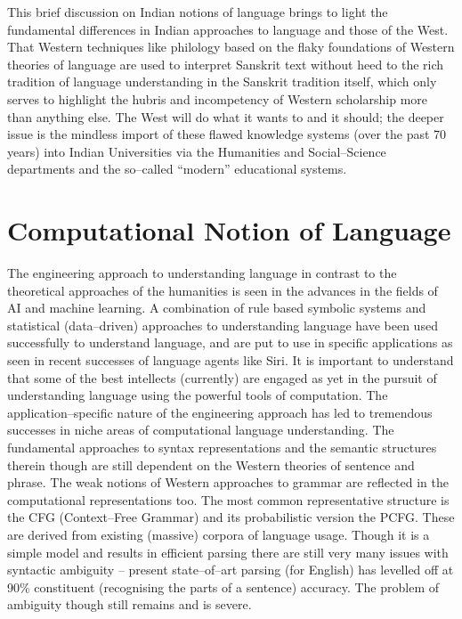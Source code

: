 This brief discussion on Indian notions of language brings to light the fundamental differences in Indian approaches to language and those of the West. That Western techniques like philology based on the flaky foundations of Western theories of language are used to interpret Sanskrit text without heed to the rich tradition of language understanding in the Sanskrit tradition itself, which only serves to highlight the hubris and incompetency of Western scholarship more than anything else. The West will do what it wants to and it should; the deeper issue is the mindless import of these flawed knowledge systems (over the past 70 years) into Indian Universities via the Humanities and Social–Science departments and the so–called “modern” educational systems.


\section*{Computational Notion of Language}

The engineering approach to understanding language in contrast to the theoretical approaches of the humanities is seen in the advances in the fields of AI and machine learning. A combination of rule based symbolic systems and statistical (data–driven) approaches to understanding language have been used successfully to understand language, and are put to use in specific applications as seen in recent successes of language agents like Siri. It is important to understand that some of the best intellects (currently) are engaged as yet in the pursuit of understanding language using the powerful tools of computation. The application–specific nature of the engineering approach has led to tremendous successes in niche areas of computational language understanding. The fundamental approaches to syntax representations and the semantic structures therein though are still dependent on the Western theories of sentence and phrase. The weak notions of Western approaches to grammar are reflected in the computational representations too. The most common representative structure is the CFG (Context–Free Grammar) and its probabilistic version the PCFG. These are derived from existing (massive) corpora of language usage. Though it is a simple model and results in efficient parsing there are still very many issues with syntactic ambiguity – present state–of–art parsing (for English) has levelled off at 90\% constituent (recognising the parts of a sentence) accuracy. The problem of ambiguity though still remains and is severe.

